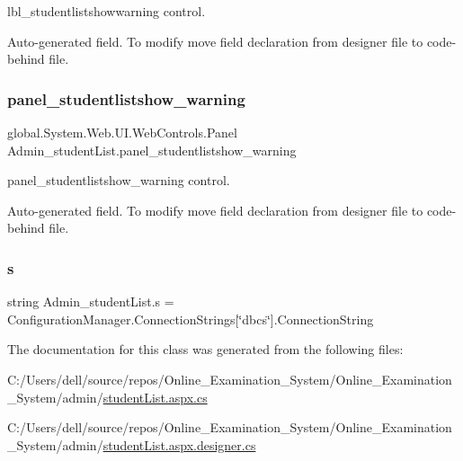 lbl\+\_\+studentlistshowwarning control. 

Auto-\/generated field. To modify move field declaration from designer file to code-\/behind file. \mbox{\label{class_admin__student_list_a9074266e82d0214c4d3ab5ee5cf59a23}} 
\subsubsection{\texorpdfstring{panel\_studentlistshow\_warning}{panel\_studentlistshow\_warning}}
{\footnotesize\ttfamily global.\+System.\+Web.\+U\+I.\+Web\+Controls.\+Panel Admin\+\_\+student\+List.\+panel\+\_\+studentlistshow\+\_\+warning\hspace{0.3cm}{\ttfamily [protected]}}



panel\+\_\+studentlistshow\+\_\+warning control. 

Auto-\/generated field. To modify move field declaration from designer file to code-\/behind file. \mbox{\label{class_admin__student_list_a3fbb033d41d031ba6bad28fb3e851cb6}} 
\subsubsection{\texorpdfstring{s}{s}}
{\footnotesize\ttfamily string Admin\+\_\+student\+List.\+s = Configuration\+Manager.\+Connection\+Strings\mbox{[}\char`\"{}dbcs\char`\"{}\mbox{]}.Connection\+String\hspace{0.3cm}{\ttfamily [private]}}



The documentation for this class was generated from the following files\+:\begin{DoxyCompactItemize}
\item 
C\+:/\+Users/dell/source/repos/\+Online\+\_\+\+Examination\+\_\+\+System/\+Online\+\_\+\+Examination\+\_\+\+System/admin/\mbox{\hyperlink{student_list_8aspx_8cs}{student\+List.\+aspx.\+cs}}\item 
C\+:/\+Users/dell/source/repos/\+Online\+\_\+\+Examination\+\_\+\+System/\+Online\+\_\+\+Examination\+\_\+\+System/admin/\mbox{\hyperlink{student_list_8aspx_8designer_8cs}{student\+List.\+aspx.\+designer.\+cs}}\end{DoxyCompactItemize}
